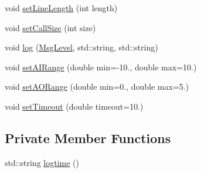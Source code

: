 \begin{DoxyCompactItemize}
\item 
void \hyperlink{classServer__NI6008_adc52659db137940242998e8e0b980c03}{set\+Line\+Length} (int length)
\item 
void \hyperlink{classServer__NI6008_ae2eab1871efb0ec0a7c0c72f56604e13}{set\+Call\+Size} (int size)
\item 
void \hyperlink{classServer__NI6008_ab83d0f144d5bb34f3a22aabef37de440}{log} (\hyperlink{classServer__NI6008_af1e3e3bac26355a746b5d2e548fe25be}{Msg\+Level}, std\+::string, std\+::string)
\item 
void \hyperlink{classServer__NI6008_a120ec56f6af12d56683322f56a8d7878}{set\+A\+I\+Range} (double min=-\/10., double max=10.)
\item 
void \hyperlink{classServer__NI6008_aec1596005b4c75cc2c13d87ab3d9d120}{set\+A\+O\+Range} (double min=0., double max=5.)
\item 
void \hyperlink{classServer__NI6008_ade018df1c5afac06e6d528536635ba48}{set\+Timeout} (double timeout=10.)
\end{DoxyCompactItemize}
\subsection*{Private Member Functions}
\begin{DoxyCompactItemize}
\item 
std\+::string \hyperlink{classServer__NI6008_aab6f8e71661f6234a72d539dedbd53d2}{logtime} ()
\end{DoxyCompactItemize}
